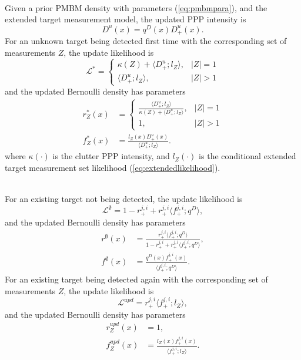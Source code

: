 ~\\
Given a prior PMBM density with parameters (\ref{eq:pmbmpara}), and the extended target measurement model, the updated PPP intensity is
\begin{equation}
    D^u(x) = q^D(x)D^u_+(x).
\end{equation}
For an unknown target being detected first time with the corresponding set of measurements $Z$, the update likelihood is
\begin{equation}
    \mathcal{L}^{*} = \begin{cases}
    \kappa(Z) + \langle D^u_+;l_Z\rangle, & |Z| = 1\\
    \langle D^u_+;l_Z\rangle, & |Z| > 1
    \end{cases}
    \label{eq:new}
\end{equation}
and the updated Bernoulli density has parameters
\begin{subequations}
\begin{align}
    r^*_Z(x) &= \begin{cases}
    \frac{\langle D^u_+;l_Z\rangle}{\kappa(Z) + \langle D^u_+;l_Z\rangle}, & |Z| = 1\\
    1, & |Z|>1
    \end{cases}\\
    f^*_Z(x) &= \frac{l_Z(x)D^u_+(x)}{\langle D^u_+;l_Z\rangle}.
\end{align}
\end{subequations}
where $\kappa(\cdot)$ is the clutter PPP intensity, and $l_Z(\cdot)$ is the conditional extended target measurement set likelihood (\ref{eq:extendedlikelihood}).

~\\
For an existing target not being detected, the update likelihood is 
\begin{equation}
    \mathcal{L}^{\emptyset} = 1 - r^{j,i}_+ + r^{j,i}_+\langle f^{j,i}_+;q^D\rangle,
    \label{eq:miss}
\end{equation}
and the updated Bernoulli density has parameters
\begin{subequations}
\begin{align}
    r^{\emptyset}(x) &= \frac{r^{j,i}_+\langle f^{j,i}_+;q^D\rangle}{1 - r^{j,i}_+ + r^{j,i}_+\langle f^{j,i}_+;q^D\rangle},\\
    f^{\emptyset}(x) &= \frac{q^D(x)f^{j,i}_+(x)}{\langle f^{j,i}_+;q^D\rangle}.
\end{align}
\end{subequations}
For an existing target being detected again with the corresponding set of measurements $Z$, the update likelihood is
\begin{equation}
    \mathcal{L}^{upd} = r^{j,i}_+\langle f^{j,i}_+;l_Z\rangle,
    \label{eq:upd}
\end{equation}
and the updated Bernoulli density has parameters
\begin{subequations}
\begin{align}
r^{upd}_Z(x)&= 1,\\
f^{upd}_Z(x) &= \frac{l_Z(x)f^{j,i}_+(x)}{\langle f^{j,i}_+;l_Z\rangle}.
\end{align}
\end{subequations}



